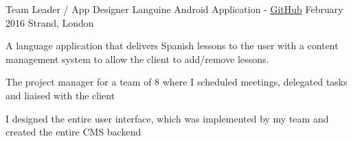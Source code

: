 \begin{cventries}
  \cventry
    {Team Leader / App Designer} %
    {Languine Android Application - \href{https://github.com/Vikash-Kothary/university-project-languine}{GitHub}} %
    {February 2016} %
    {Strand, London} %
    {
      \begin{cvitems} %
        \item {A language application that delivers Spanish lessons to the user with a content management system to allow the client to add/remove lessons.}
        \item {The project manager for a team of 8 where I scheduled meetings, delegated tasks and liaised with the client}
        \item {I designed the entire user interface, which was implemented by my team and created the entire CMS backend}
      \end{cvitems}
    }

\end{cventries}
